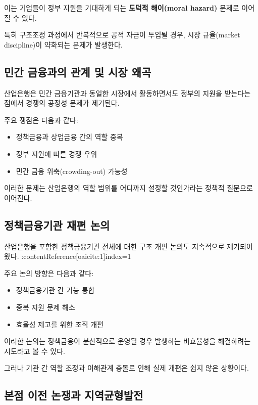 이는 기업들이 정부 지원을 기대하게 되는 \textbf{도덕적 해이(moral hazard)} 문제로 이어질 수 있다.

특히 구조조정 과정에서 반복적으로 공적 자금이 투입될 경우, 시장 규율(market discipline)이 약화되는 문제가 발생한다.

\subsection{민간 금융과의 관계 및 시장 왜곡}

산업은행은 민간 금융기관과 동일한 시장에서 활동하면서도 정부의 지원을 받는다는 점에서 경쟁의 공정성 문제가 제기된다.

주요 쟁점은 다음과 같다:

\begin{itemize}
    \item 정책금융과 상업금융 간의 역할 중복
    \item 정부 지원에 따른 경쟁 우위
    \item 민간 금융 위축(crowding-out) 가능성
\end{itemize}

이러한 문제는 산업은행의 역할 범위를 어디까지 설정할 것인가라는 정책적 질문으로 이어진다.

\subsection{정책금융기관 재편 논의}

산업은행을 포함한 정책금융기관 전체에 대한 구조 개편 논의도 지속적으로 제기되어 왔다. :contentReference[oaicite:1]{index=1}  

주요 논의 방향은 다음과 같다:

\begin{itemize}
    \item 정책금융기관 간 기능 통합
    \item 중복 지원 문제 해소
    \item 효율성 제고를 위한 조직 개편
\end{itemize}

이러한 논의는 정책금융이 분산적으로 운영될 경우 발생하는 비효율성을 해결하려는 시도라고 볼 수 있다.

그러나 기관 간 역할 조정과 이해관계 충돌로 인해 실제 개편은 쉽지 않은 상황이다.

\subsection{본점 이전 논쟁과 지역균형발전}

